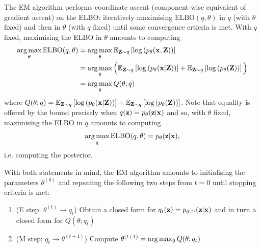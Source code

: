 \documentclass[11pt]{article}
\begin{document}
\begin{appendices}
The EM algorithm performs coordinate ascent (component-wise equivalent of gradient ascent) on the ELBO: iteratively maximising $\text{ELBO}(q,\theta)$ in $q$ (with $\theta$ fixed) and then in $\theta$ (with $q$ fixed) until some convergence crtieria is met. With $q$ fixed, maximising the ELBO in $\theta$ amounts to computing
\begin{align*}
    \operatorname*{arg\,max}_{\theta}\text{ELBO}(q,\theta)
    &=
    \operatorname*{arg\,max}_{\theta}\mathbb{E}_{\mathbf{Z}\sim q}\left[\log\left(p_{\theta}(\mathbf{x},\mathbf{Z})\right)\right]\\
    &=
    \operatorname*{arg\,max}_{\theta}\Big(\mathbb{E}_{\mathbf{Z}\sim q}\left[\log\left(p_{\theta}(\mathbf{x}|\mathbf{Z})\right)\right]+\mathbb{E}_{\mathbf{Z}\sim q}\left[\log\left(p_{\theta}(\mathbf{Z})\right)\right]\Big)\\
    &=
    \operatorname*{arg\,max}_{\theta}Q(\theta;q)
\end{align*}
where $Q(\theta;q)=\mathbb{E}_{\mathbf{Z}\sim q}\left[\log\left(p_{\theta}(\mathbf{x}|\mathbf{Z})\right)\right]+\mathbb{E}_{\mathbf{Z}\sim q}\left[\log\left(p_{\theta}(\mathbf{Z})\right)\right]$. Note that equality is offered by the bound precisely when $q(\mathbf{z})=p_{\theta}(\mathbf{z}|\mathbf{x})$ and so, with $\theta$ fixed, maximising the ELBO in $q$ amounts to computing
$$
\operatorname*{arg\,max}_{q}\text{ELBO}(q,\theta)
=
p_{\theta}(\mathbf{z}|\mathbf{x}),
$$
i.e. computing the posterior.

With both statements in mind, the EM algorithm amounts to initialising the parameters $\theta^{(0)}$ and repeating the following two steps from $t=0$ until stopping criteria is met:
\begin{enumerate}
    \item (E step: $\theta^{(t)}\to q_t$) Obtain a closed form for $q_t(\mathbf{z})=p_{\theta^{(t)}}(\mathbf{z}|\mathbf{x})$ and in turn a closed form for $Q(\theta;q_t)$
    \item (M step: $q_t\to\theta^{(t+1)}$) Compute $\theta^{(t+1)}=\operatorname*{arg\,max}_{\theta}Q(\theta;q_t)$
\end{enumerate}


\end{appendices}
\end{document}
